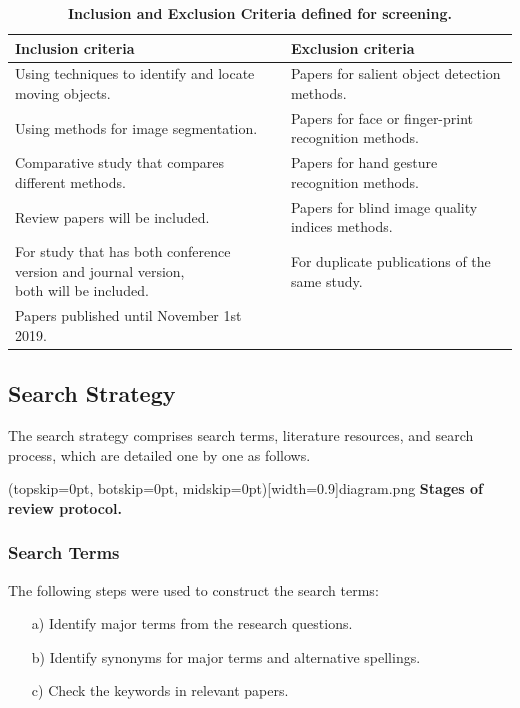 \documentclass[two column]{ieeeaccess}
\begin{document}
\begin{table}[h!]
\begin{center}
\caption{\textbf{Inclusion and Exclusion Criteria defined for screening.}}
\begin{tabular}{l|l}
\hline
        Inclusion criteria                                      &   Exclusion criteria     \\ 
\hline
        Using techniques to identify and locate moving objects. &   Papers for salient object detection methods.  \\

        Using methods for image segmentation.                   &   Papers for face or finger-print recognition methods.\\

        Comparative study that compares different methods.      &   Papers for hand gesture recognition methods.\\
        
        Review papers will be included.                         &   Papers for blind image quality indices methods.\\
        
        \makecell{For study that has both conference version and journal version,\\ both will be included.}                                                              & For duplicate publications of the same study.\\
        
        Papers published until November 1st 2019.               & \\
\hline
\end{tabular}
\end{center}
\end{table}

\subsection{Search Strategy}
The search strategy comprises search terms, literature resources, and search process, which are detailed one by one as follows.

\Figure[t!](topskip=0pt, botskip=0pt, midskip=0pt)[width=0.9\linewidth]{diagram.png}
{\textbf{Stages of review protocol.}\label{fig11}}

\subsubsection{Search Terms}
The following steps were used to construct the search terms:
\begin{itemize}

    \item[a)]Identify major terms from the research questions.
    
    \item[b)]Identify synonyms for major terms and alternative spellings.
    
    \item[c)]Check the keywords in relevant papers.
    
\end{itemize}
\end{document}
